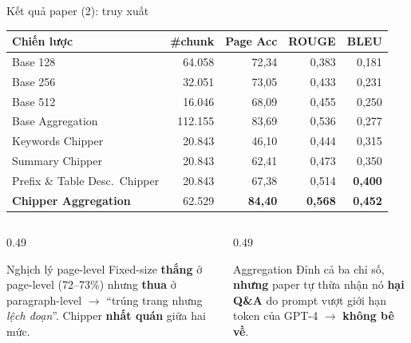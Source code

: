 \documentclass[aspectratio=169,11pt]{beamer}
\begin{document}
\begin{frame}{Kết quả paper (2): truy xuất}
  \centering\footnotesize
  \begin{tabular}{@{}lrrrr@{}}
    \toprule
    \textbf{Chiến lược} & \textbf{\#chunk} & \textbf{Page Acc} & \textbf{ROUGE} & \textbf{BLEU} \\
    \midrule
    Base 128 & 64.058 & 72,34 & 0,383 & 0,181 \\
    Base 256 & 32.051 & 73,05 & 0,433 & 0,231 \\
    Base 512 & 16.046 & 68,09 & 0,455 & 0,250 \\
    Base Aggregation & 112.155 & 83,69 & 0,536 & 0,277 \\
    Keywords Chipper & 20.843 & 46,10 & 0,444 & 0,315 \\
    Summary Chipper & 20.843 & 62,41 & 0,473 & 0,350 \\
    Prefix \& Table Desc.\ Chipper & 20.843 & 67,38 & 0,514 & \textbf{0,400} \\
    \midrule
    \textbf{Chipper Aggregation} & 62.529 & \textbf{84,40} & \textbf{0,568} & \textbf{0,452} \\
    \bottomrule
  \end{tabular}
  \vspace{0.4em}
  \begin{columns}[T]
    \begin{column}{0.49\textwidth}
      \begin{block}{\small Nghịch lý page-level}
        Fixed-size \textbf{thắng} ở page-level (72--73\%) nhưng \textbf{thua} ở
        paragraph-level $\rightarrow$ ``trúng trang nhưng \emph{lệch đoạn}''. Chipper
        \textbf{nhất quán} giữa hai mức.
      \end{block}
    \end{column}
    \begin{column}{0.49\textwidth}
      \begin{alertblock}{\small Aggregation}
        Đỉnh cả ba chỉ số, \textbf{nhưng} paper tự thừa nhận nó \textbf{hại Q\&A}
        do prompt vượt giới hạn token của GPT-4 $\rightarrow$ \textbf{không bê về}.
      \end{alertblock}
    \end{column}
  \end{columns}
\end{frame}
\end{document}
